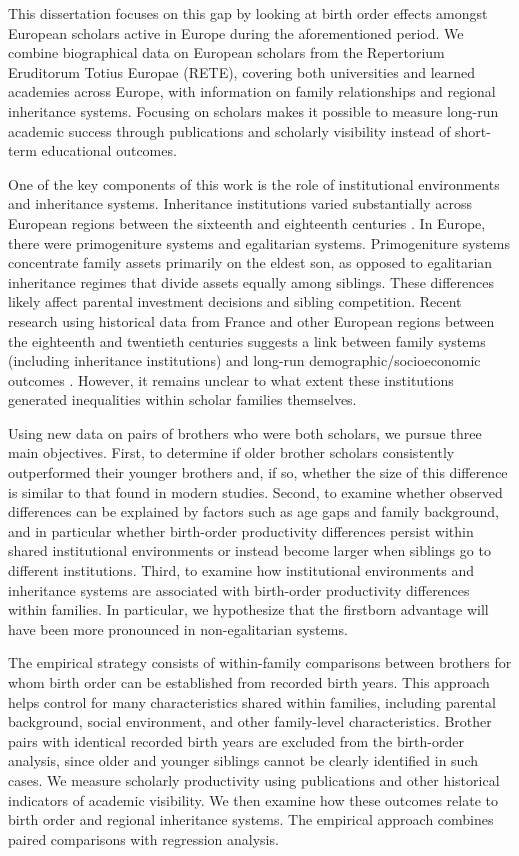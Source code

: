 This dissertation focuses on this gap by looking at birth order effects amongst European scholars active in Europe during the aforementioned period. We combine biographical data on European scholars from the Repertorium Eruditorum Totius Europae (RETE), covering both universities and learned academies across Europe, with information on family relationships and regional inheritance systems. Focusing on scholars makes it possible to measure long-run academic success through publications and scholarly visibility instead of short-term educational outcomes.

One of the key components of this work is the role of institutional environments and inheritance systems. Inheritance institutions varied substantially across European regions between the sixteenth and eighteenth centuries \citep{Todd1990}. In Europe, there were primogeniture systems and egalitarian systems. Primogeniture systems concentrate family assets primarily on the eldest son, as opposed to egalitarian inheritance regimes that divide assets equally among siblings. These differences likely affect parental investment decisions and sibling competition. Recent research using historical data from France and other European regions between the eighteenth and twentieth centuries suggests a link between family systems (including inheritance institutions) and long-run demographic/socioeconomic outcomes \citep{Duranton2008, Gobbi2025}. However, it remains unclear to what extent these institutions generated inequalities within scholar families themselves.

Using new data on pairs of brothers who were both scholars, we pursue three main objectives. First, to determine if older brother scholars consistently outperformed their younger brothers and, if so, whether the size of this difference is similar to that found in modern studies. Second, to examine whether observed differences can be explained by factors such as age gaps and family background, and in particular whether birth-order productivity differences persist within shared institutional environments or instead become larger when siblings go to different institutions. Third, to examine how institutional environments and inheritance systems are associated with birth-order productivity differences within families. In particular, we hypothesize that the firstborn advantage will have been more pronounced in non-egalitarian systems.

The empirical strategy consists of within-family comparisons between brothers for whom birth order can be established from recorded birth years. This approach helps control for many characteristics shared within families, including parental background, social environment, and other family-level characteristics. Brother pairs with identical recorded birth years are excluded from the birth-order analysis, since older and younger siblings cannot be clearly identified in such cases. We measure scholarly productivity using publications and other historical indicators of academic visibility. We then examine how these outcomes relate to birth order and regional inheritance systems. The empirical approach combines paired comparisons with regression analysis.

